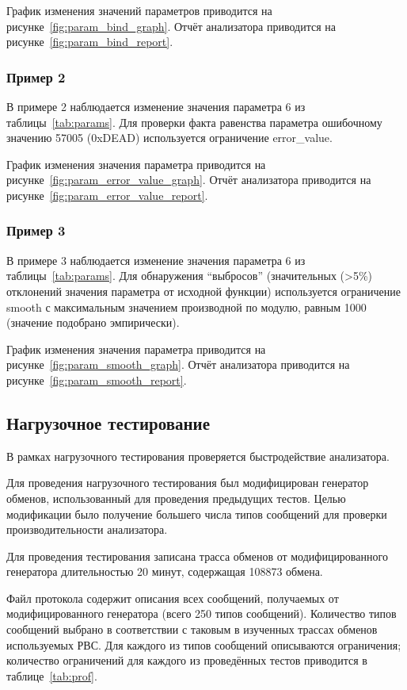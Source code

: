 График изменения значений параметров 
приводится на рисунке~\ref{fig:param_bind_graph}. Отчёт анализатора приводится 
на рисунке~\ref{fig:param_bind_report}.

\subsubsection{Пример 2}

В примере 2 наблюдается изменение значения параметра 6 из 
таблицы~\ref{tab:params}. Для проверки факта равенства параметра ошибочному 
значению 57005 (0xDEAD) используется ограничение error\_value.

График изменения значения параметра 
приводится на рисунке~\ref{fig:param_error_value_graph}. Отчёт анализатора 
приводится на рисунке~\ref{fig:param_error_value_report}.

\subsubsection{Пример 3}

В примере 3 наблюдается изменение значения параметра 6 из 
таблицы~\ref{tab:params}. Для обнаружения ``выбросов'' (значительных (>5\%)
отклонений значения параметра от исходной функции) используется ограничение 
smooth с максимальным значением производной по модулю, равным 1000 (значение 
подобрано эмпирически).

График изменения значения параметра 
приводится на рисунке~\ref{fig:param_smooth_graph}. Отчёт анализатора 
приводится на рисунке~\ref{fig:param_smooth_report}.

\subsection{Нагрузочное тестирование}

В рамках нагрузочного тестирования проверяется быстродействие анализатора.

Для проведения нагрузочного тестирования был модифицирован генератор обменов, 
использованный для проведения предыдущих тестов. Целью модификации было 
получение большего числа типов сообщений для проверки производительности 
анализатора.

Для проведения тестирования записана трасса обменов от 
модифицированного генератора длительностью 20 минут, содержащая 108873 обмена. 

Файл протокола содержит описания всех сообщений, получаемых от 
модифицированного генератора (всего 250 типов сообщений). Количество типов 
сообщений выбрано в соответствии с таковым в изученных трассах обменов 
используемых РВС. Для каждого из типов сообщений описываются ограничения; 
количество ограничений для каждого из проведённых тестов приводится в 
таблице~\ref{tab:prof}.


